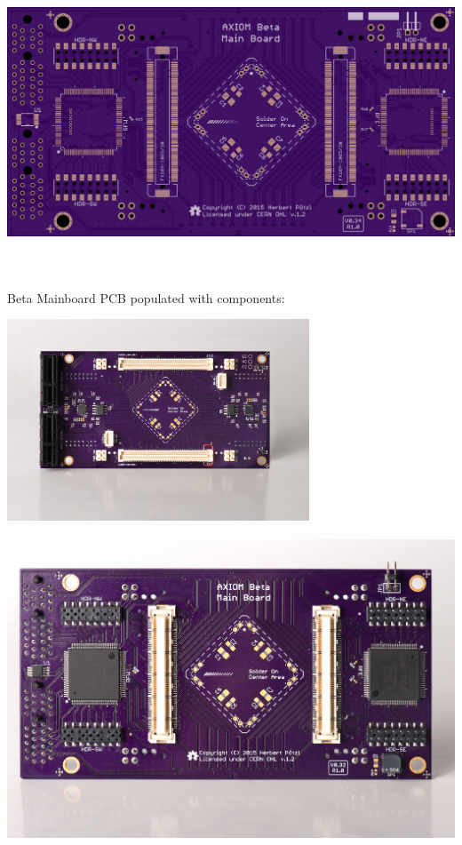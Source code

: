 \begin{center}
\includegraphics[height=9cm]{images/Beta_Main_Board_Bottom}
\end{center}

Beta Mainboard PCB populated with components:\\

\begin{center}
\includegraphics[height=6cm]{images/BetaMainboard_0.32_BOTTOM}
\end{center}

\begin{center}
\includegraphics[height=9cm]{images/BetaMainboard_0.32_TOP}
\end{center}




